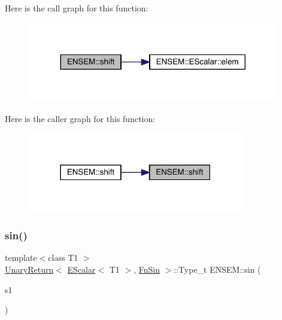 Here is the call graph for this function\+:
\nopagebreak
\begin{figure}[H]
\begin{center}
\leavevmode
\includegraphics[width=311pt]{d4/dca/group__escalar_gaeaac3a9b82b6d6c8f0ec25efb3242cfe_cgraph}
\end{center}
\end{figure}
Here is the caller graph for this function\+:
\nopagebreak
\begin{figure}[H]
\begin{center}
\leavevmode
\includegraphics[width=267pt]{d4/dca/group__escalar_gaeaac3a9b82b6d6c8f0ec25efb3242cfe_icgraph}
\end{center}
\end{figure}
\mbox{\label{group__escalar_ga373122acba11edfbe0eff82093788afe}} 
\subsubsection{\texorpdfstring{sin()}{sin()}}
{\footnotesize\ttfamily template$<$class T1 $>$ \\
\mbox{\hyperlink{structENSEM_1_1UnaryReturn}{Unary\+Return}}$<$ \mbox{\hyperlink{classENSEM_1_1EScalar}{E\+Scalar}}$<$ T1 $>$, \mbox{\hyperlink{structENSEM_1_1FnSin}{Fn\+Sin}} $>$\+::Type\+\_\+t E\+N\+S\+E\+M\+::sin (\begin{DoxyParamCaption}\item[{const \mbox{\hyperlink{classENSEM_1_1EScalar}{E\+Scalar}}$<$ T1 $>$ \&}]{s1 }\end{DoxyParamCaption})\hspace{0.3cm}{\ttfamily [inline]}}

